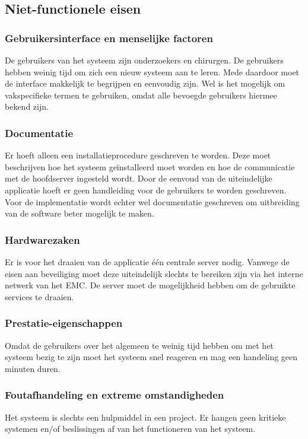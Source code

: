 \subsection{Niet-functionele eisen}
\label{nietfunctioneleeisen}

\subsubsection{Gebruikersinterface en menselijke factoren}
De gebruikers van het systeem zijn onderzoekers en chirurgen. 
De gebruikers hebben weinig tijd om zich een nieuw systeem aan te leren. 
Mede daardoor moet de interface makkelijk te begrijpen en eenvoudig zijn. 
Wel is het mogelijk om vakspecifieke termen te gebruiken, omdat alle bevoegde gebruikers hiermee bekend zijn.

\subsubsection{Documentatie}
Er hoeft alleen een installatieprocedure geschreven te worden. 
Deze moet beschrijven hoe het systeem ge\"installeerd moet worden en hoe de communicatie met de hoofdserver ingesteld wordt. 
Door de eenvoud van de uiteindelijke applicatie hoeft er geen handleiding voor de gebruikers te worden geschreven.
Voor de implementatie wordt echter wel documentatie geschreven om uitbreiding van de software beter mogelijk te maken.

\subsubsection{Hardwarezaken}
Er is voor het draaien van de applicatie \'e\'en centrale server nodig.
Vanwege de eisen aan beveiliging moet deze uiteindelijk slechts te bereiken zijn via het interne netwerk van het EMC. 
De server moet de mogelijkheid hebben om de gebruikte services te draaien. 

\subsubsection{Prestatie-eigenschappen}
Omdat de gebruikers over het algemeen te weinig tijd hebben om met het systeem bezig te zijn moet het systeem snel reageren en mag een handeling geen minuten duren.

\subsubsection{Foutafhandeling en extreme omstandigheden}
Het systeem is slechts een hulpmiddel in een project. Er hangen geen kritieke systemen en/of beslissingen af van het functioneren van het systeem.


